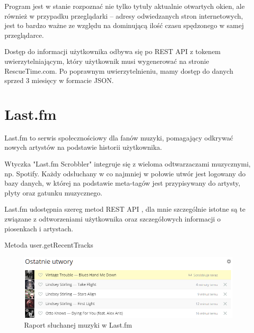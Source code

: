\documentclass[brudnopis]{xmgr}
\begin{document}
            Program jest w stanie rozpoznać nie tylko tytuły aktualnie otwartych okien,
            ale również w przypadku przeglądarki – adresy odwiedzanych stron internetowych,
            jest to bardzo ważne ze względu na dominującą ilość czasu spędzonego w samej przeglądarce.

            Dostęp do informacji użytkownika odbywa się po REST API z tokenem uwierzytelniającym,
            który użytkownik musi wygenerować na stronie RescueTime.com.
            Po poprawnym uwierzytelnieniu, mamy dostęp do danych sprzed 3 miesięcy w formacie JSON.

        \section*{Last.fm}

            Last.fm to serwis społecznościowy dla fanów muzyki,
            pomagający odkrywać nowych artystów na podstawie historii użytkownika.

            Wtyczka "Last.fm Scrobbler"\cite{lastfm:trackmymusic} integruje się z wieloma odtwarzaczami muzycznymi, np. Spotify.
            Każdy odsłuchany w co najmniej w połowie utwór jest logowany do bazy danych,
            w której na podstawie meta-tagów jest przypisywany do artysty, płyty oraz gatunku muzycznego.

            Last.fm udostępnia szereg metod REST API \cite{lastfm:apidoc},
            dla mnie szczególnie istotne są te związane z odtworzeniami użytkownika oraz szczegółowych informacji o piosenkach i artystach.

            Metoda user.getRecentTracks %


        \begin{figure}
          \includegraphics[width=\linewidth]{fig/lastfm-now-listening.png}
          \caption{Raport słuchanej muzyki w Last.fm}
          \label{fig:Last.fm}
        \end{figure}
\end{document}
